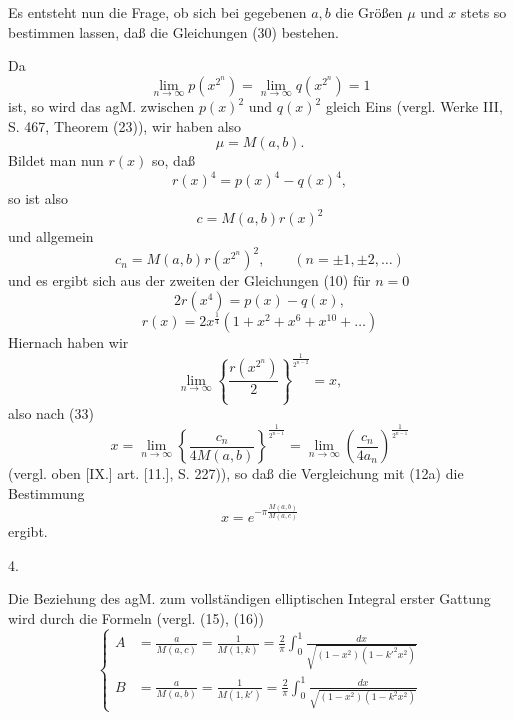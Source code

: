 \noindent Es entsteht nun die Frage, ob sich bei gegebenen $a,b$ die Größen $\mu$ und $x$ stets so bestimmen lassen, daß die Gleichungen (30) bestehen.
\par\indent Da
\[\lim_{n\to\infty}p(x^{2^n})=\lim_{n\to\infty}q(x^{2^n})=1\]
\noindent ist, so wird das agM. zwischen $p(x)^2$ und $q(x)^2$ gleich Eins (vergl. Werke III, S. 467, Theorem (23)), wir haben also
\begin{equation*}\tag*{(32)}\mu=M(a,b).\end{equation*}
\noindent Bildet man nun $r(x)$ so, daß
\[r(x)^4=p(x)^4-q(x)^4,\]
\noindent so ist also
\begin{equation*}\tag*{(33)}c=M(a,b)r(x)^2\end{equation*}
\noindent und allgemein
\begin{equation*}\tag*{(33a)}c_n=M(a,b)r(x^{2^n})^2,\qquad(n=\pm1,\pm2,\ldots)\end{equation*}
\noindent und es ergibt sich aus der zweiten der Gleichungen (10) für $n=0$
\begin{equation*}\tag*{(34)}2r(x^4)=p(x)-q(x),\end{equation*}
\begin{equation*}\tag*{(35)}r(x)=2x^{\frac14}(1+x^2+x^6+x^{10}+\ldots)\end{equation*}
\noindent Hiernach haben wir
\begin{equation*}\tag*{(36)}\lim_{n\to\infty}\left\{\frac{r(x^{2^n})}{2}\right\}^{\frac1{2^{n-2}}}=x,\end{equation*}
\noindent also nach (33)
\begin{equation*}\tag*{(37)}x=\lim_{n\to\infty}\left\{\frac{c_n}{4M(a,b)}\right\}^{\frac1{2^{n-1}}}=\lim_{n\to\infty}\left(\frac{c_n}{4a_n}\right)^{\frac1{2^{n-1}}}\end{equation*}
\noindent (vergl. oben [IX.] art. [11.], S. 227)), so daß die Vergleichung mit (12a) die Bestimmung
\begin{equation*}\tag*{(38)}x=e^{-\pi\frac{M(a,b)}{M(a,c)}}\end{equation*}
\noindent ergibt.
\begin{center}4.\end{center}
\par\indent Die Beziehung des agM. zum vollständigen elliptischen Integral erster Gattung wird durch die Formeln (vergl. (15), (16))
\begin{equation*}\tag*{(39)}
\left\{\begin{aligned}
A&=\frac a{M(a,c)}=\frac1{M(1,k)}=\frac2\pi\int_0^1\frac{dx}{\sqrt{(1-x^2)(1-k'^2x^2)}}\\[6pt]
B&=\frac a{M(a,b)}=\frac1{M(1,k')}=\frac2\pi\int_0^1\frac{dx}{\sqrt{(1-x^2)(1-k^2x^2)}}
\end{aligned}\right.
\end{equation*}
